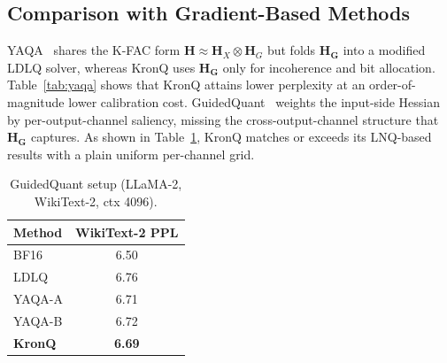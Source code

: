 \documentclass{article} %
\begin{document}
\subsection{Comparison with Gradient-Based Methods}
\label{app:related-quant}

YAQA~\citep{tseng2025model} shares the K-FAC form $\mathbf{H} \approx \mathbf{H}_X \otimes \mathbf{H}_G$ but folds $\mathbf{H_G}$ into a modified LDLQ solver, whereas KronQ uses $\mathbf{H_G}$ only for incoherence and bit allocation. Table~\ref{tab:yaqa} shows that KronQ attains lower perplexity at an order-of-magnitude lower calibration cost.
GuidedQuant~\citep{kim2025guidedquant} weights the input-side Hessian by per-output-channel saliency, missing the cross-output-channel structure that $\mathbf{H_G}$ captures. As shown in Table~\ref{tab:guidedquant}, KronQ matches or exceeds its LNQ-based results with a plain uniform per-channel grid.

\begin{table}[h]
\centering
\begin{minipage}[t]{0.4\linewidth}
\centering
\caption{YAQA setup (LLaMA-3.1-8B-Instruct, WikiText-2, ctx 8192, INT4 per-channel).}
\label{tab:yaqa}
\vspace{2pt}
\footnotesize
\begin{tabular}{lc}
\toprule
Method & WikiText-2 PPL \\
\midrule
BF16 & 6.50 \\
LDLQ & 6.76 \\
YAQA-A & 6.71 \\
YAQA-B & 6.72 \\
\cellcolor{gray!15}\textbf{KronQ} & \cellcolor{gray!15}\textbf{6.69} \\
\bottomrule
\end{tabular}
\end{minipage}\hfill
\begin{minipage}[t]{0.56\linewidth}
\centering
\caption{GuidedQuant setup (LLaMA-2, WikiText-2, ctx 4096).}
\label{tab:guidedquant}
\vspace{6pt}
\footnotesize
{}
\end{minipage}
\end{table}
\end{document}

